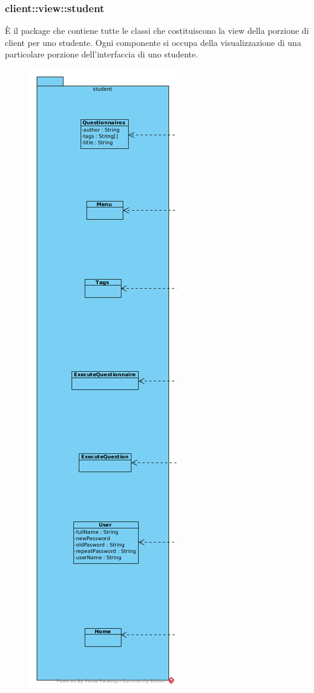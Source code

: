 \subsubsection{client::view::student}
È il package che contiene tutte le classi che costituiscono la view della porzione di client per uno studente. Ogni componente si occupa della visualizzazione di una particolare porzione dell'interfaccia di uno studente.\begin{center}
		\begin{figure}[H]
			\centering \includegraphics[scale=4, max width=\textwidth, max height=\myheight]{../img/diagrammiClassi/client/view/student.png}

\end{figure}
\end{center}
